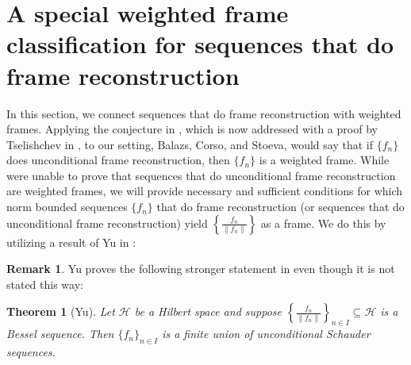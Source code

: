 \documentclass[11pt]{amsart}
\newtheorem*{thm*}{Theorem}
\theoremstyle{definition}
\newtheorem{rem}[thm]{Remark}
\numberwithin{equation}{section}
\newcommand{\Hcal}{\mathcal{H}} %
\begin{document}
\section{A special weighted frame classification for sequences that do frame reconstruction}\label{s6}

In this section, we connect sequences that do frame reconstruction with weighted frames. Applying the conjecture in \cite{Balazs2023Weighted}, which is now addressed with a proof by Tselishchev in \cite{Tselishchev2025Rescaling}, to our setting, Balazs, Corso, and Stoeva, would say that if $\{f_n\}$ does unconditional frame reconstruction, then $\{f_n\}$ is a weighted frame. While were unable to prove that sequences that do unconditional frame reconstruction are weighted frames, we will provide necessary and sufficient conditions for which norm bounded sequences $\{f_n\}$ that do frame reconstruction (or sequences that do unconditional frame reconstruction) yield $\left\{\frac{f_n}{\|f_n\|} \right\}$ as a frame. We do this by utilizing a result of Yu in \cite{Yu2024Frame}:
\begin{rem}
Yu proves the following stronger statement in \cite{Yu2024Frame} even though it is not stated this way:
\end{rem}

\begin{thm*}[Yu]
Let $\Hcal$ be a Hilbert space and suppose $\left\{\frac{f_n}{\|f_n\|} \right\}_{n\in I}\subseteq \Hcal$ is a Bessel sequence. Then $\{f_{n}\}_{n\in I}$
is a finite union of unconditional Schauder sequences.
\end{thm*}
\end{document}
